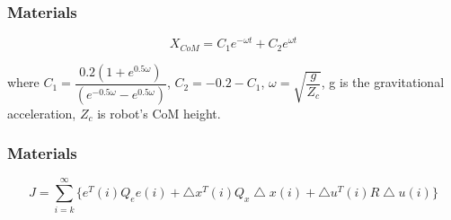 \documentclass{beamer}
\begin{document}
	\begin{frame}
		\frametitle{Materials} 
		
		\begin{equation}
		X_{CoM} = C_1 e^{-\omega t} + C_2 e^{\omega t}
		\end{equation}
		
		where $C_1 = \dfrac{0.2(1+e^{0.5\omega })}{(e^{-0.5\omega }-e^{0.5\omega })}$, $C_2=-0.2-C_1$, $\omega = \sqrt{\dfrac{g}{Z_c}}$, g is the gravitational acceleration, $Z_c$ is robot's CoM height.
	\end{frame}
	
	
	\begin{frame}
		\frametitle{Materials} 
		
		\begin{equation}
			J = \sum^\infty_{i = k} \{e^T(i) Q_e e(i) + \bigtriangleup x^T(i) Q_x \bigtriangleup x(i) + \bigtriangleup u^T(i) R \bigtriangleup u(i) \}
		\end{equation}
	\end{frame}
		
\end{document}
